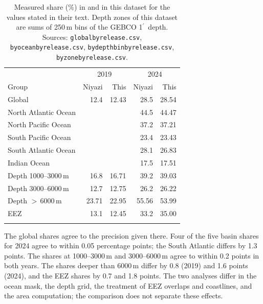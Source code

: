 \documentclass[essd, manuscript]{copernicus}
\newcommand{\am}{$^{\prime}$}            %
\renewcommand{\_}{\usorig\allowbreak}
\begin{document}
\begin{table}[t]
\caption{Measured share (\%) in \citet{niyazi2025} and in this dataset for the values stated in their text. Depth zones of this dataset are sums of 250\,m bins of the GEBCO\_2026 1\am\ depth. Sources: \texttt{global\_by\_release.csv}, \texttt{by\_ocean\_by\_release.csv}, \texttt{by\_depth\_bin\_by\_release.csv}, \texttt{by\_zone\_by\_release.csv}.}
\label{tab:niyazi}
\small
\begin{tabular}{lrrrr}
\tophline
 & \multicolumn{2}{c}{2019} & \multicolumn{2}{c}{2024} \\
Group & Niyazi & This & Niyazi & This \\
\middlehline
Global & 12.4 & 12.43 & 28.5 & 28.54 \\
North Atlantic Ocean & & & 44.5 & 44.47 \\
North Pacific Ocean & & & 37.2 & 37.21 \\
South Pacific Ocean & & & 23.4 & 23.43 \\
South Atlantic Ocean & & & 28.1 & 26.83 \\
Indian Ocean & & & 17.5 & 17.51 \\
Depth 1000--3000\,m & 16.8 & 16.71 & 39.2 & 39.03 \\
Depth 3000--6000\,m & 12.7 & 12.75 & 26.2 & 26.22 \\
Depth $>$\,6000\,m & 23.71 & 22.95 & 55.56 & 53.99 \\
EEZ & 13.1 & 12.45 & 33.2 & 35.00 \\
\bottomhline
\end{tabular}
\end{table}

The global shares agree to the precision given there.
Four of the five basin shares for 2024 agree to within 0.05 percentage points; the South Atlantic differs by 1.3 points.
The shares at 1000--3000\,m and 3000--6000\,m agree to within 0.2 points in both years.
The shares deeper than 6000\,m differ by 0.8 (2019) and 1.6 points (2024), and the EEZ shares by 0.7 and 1.8 points.
The two analyses differ in the ocean mask, the depth grid, the treatment of EEZ overlaps and coastlines, and the area computation; the comparison does not separate these effects.
\end{document}
